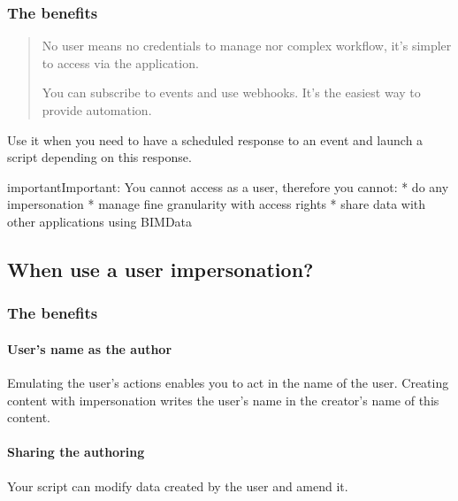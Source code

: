 \documentclass[a4paper,12pt,english]{sphinxmanual}
\begin{document}
\subsubsection{The benefits}
\label{\detokenize{guide/authentication_bimdata_connect:the-benefits}}\begin{quote}


No user means no credentials to manage nor complex workflow, it’s simpler to access via the application.


You can subscribe to events and use webhooks. It’s the easiest way to provide automation.
\end{quote}

Use it when you need to have a scheduled response to an event and launch a script depending on this response.

\begin{sphinxadmonition}{important}{Important:}
You cannot access as a user, therefore you cannot:
* do any impersonation
* manage fine granularity with access rights
* share data with other applications using BIMData
\end{sphinxadmonition}


\subsection{When use a user impersonation?}
\label{\detokenize{guide/authentication_bimdata_connect:when-use-a-user-impersonation}}

\subsubsection{The benefits}
\label{\detokenize{guide/authentication_bimdata_connect:id1}}

\paragraph{User’s name as the author}
\label{\detokenize{guide/authentication_bimdata_connect:user-s-name-as-the-author}}
Emulating the user’s actions enables you to act in the name of the user.
Creating content with impersonation writes the user’s name in the creator’s name of this content.


\paragraph{Sharing the authoring}
\label{\detokenize{guide/authentication_bimdata_connect:sharing-the-authoring}}
Your script can modify data created by the user and amend it.
\end{document}
